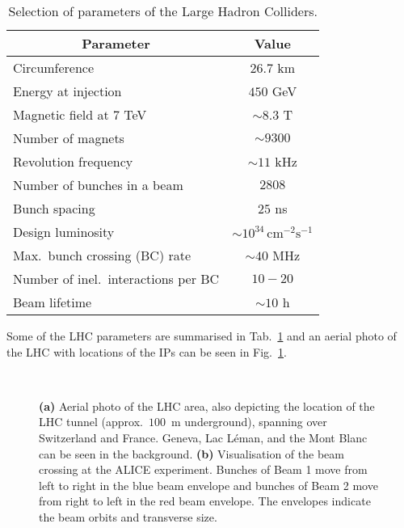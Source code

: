 \begin{table}[h!]
\centering
\caption{Selection of parameters of the Large Hadron Colliders. \cite{schmidtProtectionCERNLarge2006} }
\label{tab:alice:lhcpars}
\begin{tabular}{|cc|c|}
\hline
\multicolumn{2}{|c|}{\parbox[b][1.2em]{2em}{} Parameter} & Value \\ \hline
\multicolumn{2}{|l|}{\parbox[b][1.1em]{1em}{}Circumference} &  $26.7$ km\\ \hline
\multicolumn{2}{|l|}{\parbox[b][1.1em]{1em}{}Energy at injection} &  $450$ GeV\\ \hline
\multicolumn{2}{|l|}{\parbox[b][1.1em]{1em}{}Magnetic field at 7 TeV} &  $\sim 8.3$ T\\ \hline
\multicolumn{2}{|l|}{\parbox[b][1.1em]{1em}{}Number of magnets} &  $\sim 9300$\\ \hline
\multicolumn{2}{|l|}{\parbox[b][1.1em]{1em}{}Revolution frequency} &  $\sim 11$ kHz\\ \hline
\multicolumn{2}{|l|}{\parbox[b][1.1em]{1em}{}Number of bunches in a beam} &  $2808$\\ \hline
\multicolumn{2}{|l|}{\parbox[b][1.1em]{1em}{}Bunch spacing} &  $25$ ns\\ \hline
\multicolumn{2}{|l|}{\parbox[b][1.1em]{1em}{}Design luminosity} &  $\sim 10^{34} \, \mathrm{cm^{-2}s^{-1}}$\\ \hline
\multicolumn{2}{|l|}{\parbox[b][1.1em]{1em}{}Max.\ bunch crossing (BC) rate} &  $\sim 40$ MHz\\ \hline
\multicolumn{2}{|l|}{\parbox[b][1.1em]{1em}{}Number of inel.\ interactions per BC} &  $10-20$\\ \hline
\multicolumn{2}{|l|}{\parbox[b][1.1em]{1em}{}Beam lifetime} &  $\sim 10$ h\\ \hline
\end{tabular}
\end{table}

Some of the LHC parameters are summarised in Tab.~\ref{tab:alice:lhcpars} and an aerial photo of the LHC with locations of the IPs can be seen in Fig.~\ref{fig:alice:lhc}.

\begin{figure}%
\\
\caption{\textbf{(a)} Aerial photo of the LHC area, also depicting the location of the LHC tunnel (approx.\ $100$~m underground), spanning over Switzerland and France. Geneva, Lac Léman, and the Mont Blanc can be seen in the background. \cite{briceAerialViewCERN2008} \textbf{(b)} Visualisation of the beam crossing at the ALICE experiment. Bunches of Beam 1 move from left to right in the blue beam envelope and bunches of Beam 2 move from right to left in the red beam envelope. The envelopes indicate the beam orbits and transverse size. \cite{LHCReportMake2023}}
\label{fig:alice:lhc}
\end{figure}

